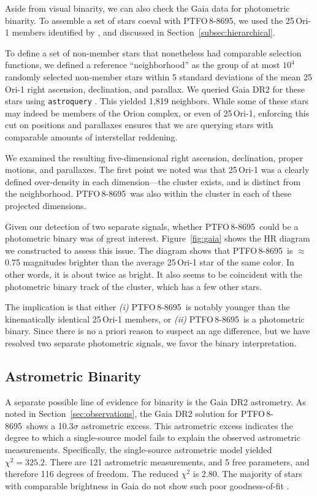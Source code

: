 \documentclass[12pt,twocolumn,tighten]{aastex62}
\newcommand{\ptfo}{PTFO$\,$8-8695}
\begin{document}
Aside from visual binarity, we can also check the Gaia data
for photometric binarity.
To assemble a set of stars coeval with \ptfo,
we used the 25$\,$Ori-1 members identified by
\citet{kounkel_apogee2_2018}, and discussed in Section~\ref{subsec:hierarchical}.

To define a set of non-member stars that nonetheless had comparable
selection functions, we defined a reference ``neighborhood'' as the
group of at most $10^4$ randomly selected non-member stars within 5
standard deviations of the mean 25$\,$Ori-1 right ascension,
declination, and parallax.  We queried Gaia DR2 for these stars using
\texttt{astroquery} \citep{astroquery_2018}.  This yielded 1{,}819 neighbors.  While
some of these stars may indeed be members of the Orion complex, or
even of 25$\,$Ori-1, enforcing this cut on positions and parallaxes
ensures that we are querying stars with comparable amounts of
interstellar reddening.

We examined the resulting five-dimensional right ascension,
declination, proper motions, and parallaxes.  The first point we noted
was that 25$\,$Ori-1 was a clearly defined over-density in each
dimension---the cluster exists, and is distinct from the
neighborhood.  \ptfo\ was also within the cluster in each of these
projected dimensions.

Given our detection of two separate signals, whether \ptfo\ could be a
photometric binary was of great interest.  Figure~\ref{fig:gaia} shows
the HR diagram we constructed to assess this issue.  The diagram shows
that \ptfo\ is $\approx$0.75 magnitudes brighter than the average
25$\,$Ori-1 star of the same color.  In other words, it is about twice
as bright.  It also seems to be coincident with the photometric binary track of the
cluster, which has a few other stars.

The implication is that either {\it (i)} \ptfo\ is notably younger
than the kinematically identical 25$\,$Ori-1 members, or {\it (ii)} \ptfo\
is a photometric binary.
Since there is no a priori reason to suspect an age difference,
but we have resolved two
separate photometric signals, we favor the binary interpretation.


\subsection{Astrometric Binarity}

A separate possible line of evidence for binarity is the Gaia DR2 astrometry.
As noted in Section~\ref{sec:observations}, the Gaia DR2 solution for
\ptfo\ shows a 10.3$\sigma$ astrometric excess.  This astrometric
excess indicates the degree to which a single-source model fails to
explain the observed astrometric measurements.  Specifically, the
single-source astrometric model yielded $\chi^2=325.2$.  There
are 121 astrometric measurements, and 5 free parameters, and therefore
116 degrees of freedom. The reduced $\chi^2$ is 2.80.  The
majority of stars with comparable brightness in Gaia do not show such
poor goodness-of-fit \citep[][Appendix A]{lindegren_gaiasoln_2018}.
\end{document}
